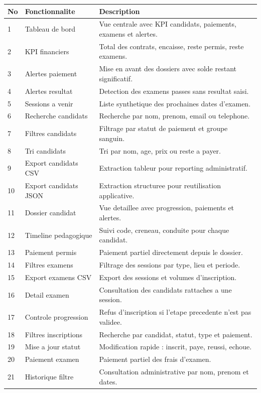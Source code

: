 \documentclass[11pt,a4paper]{article}
\begin{document}
\begin{longtable}{p{0.9cm}p{5.1cm}p{8.4cm}}
\toprule
\textbf{No} & \textbf{Fonctionnalite} & \textbf{Description} \\
\midrule
\endhead
1 & Tableau de bord & Vue centrale avec KPI candidats, paiements, examens et alertes. \\
2 & KPI financiers & Total des contrats, encaisse, reste permis, reste examens. \\
3 & Alertes paiement & Mise en avant des dossiers avec solde restant significatif. \\
4 & Alertes resultat & Detection des examens passes sans resultat saisi. \\
5 & Sessions a venir & Liste synthetique des prochaines dates d'examen. \\
6 & Recherche candidats & Recherche par nom, prenom, email ou telephone. \\
7 & Filtres candidats & Filtrage par statut de paiement et groupe sanguin. \\
8 & Tri candidats & Tri par nom, age, prix ou reste a payer. \\
9 & Export candidats CSV & Extraction tableur pour reporting administratif. \\
10 & Export candidats JSON & Extraction structuree pour reutilisation applicative. \\
11 & Dossier candidat & Vue detaillee avec progression, paiements et alertes. \\
12 & Timeline pedagogique & Suivi code, creneau, conduite pour chaque candidat. \\
13 & Paiement permis & Paiement partiel directement depuis le dossier. \\
14 & Filtres examens & Filtrage des sessions par type, lieu et periode. \\
15 & Export examens CSV & Export des sessions et volumes d'inscription. \\
16 & Detail examen & Consultation des candidats rattaches a une session. \\
17 & Controle progression & Refus d'inscription si l'etape precedente n'est pas validee. \\
18 & Filtres inscriptions & Recherche par candidat, statut, type et paiement. \\
19 & Mise a jour statut & Modification rapide : inscrit, paye, reussi, echoue. \\
20 & Paiement examen & Paiement partiel des frais d'examen. \\
21 & Historique filtre & Consultation administrative par nom, prenom et dates. \\

\end{longtable}
\end{document}
